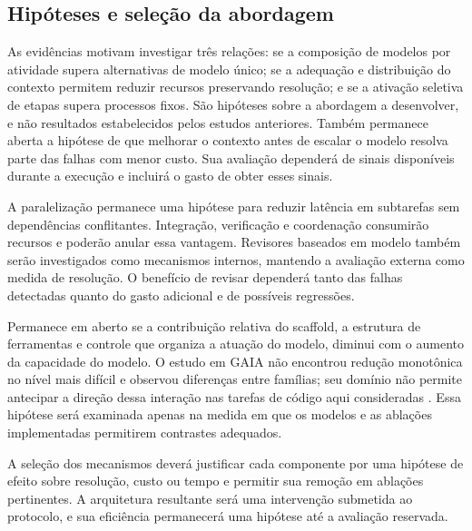 \subsection{Hipóteses e seleção da abordagem}

As evidências motivam investigar três relações: se a composição de modelos por atividade supera alternativas de modelo único; se a adequação e distribuição do contexto permitem reduzir recursos preservando resolução; e se a ativação seletiva de etapas supera processos fixos. São hipóteses sobre a abordagem a desenvolver, e não resultados estabelecidos pelos estudos anteriores. Também permanece aberta a hipótese de que melhorar o contexto antes de escalar o modelo resolva parte das falhas com menor custo. Sua avaliação dependerá de sinais disponíveis durante a execução e incluirá o gasto de obter esses sinais.

A paralelização permanece uma hipótese para reduzir latência em subtarefas sem dependências conflitantes. Integração, verificação e coordenação consumirão recursos e poderão anular essa vantagem. Revisores baseados em modelo também serão investigados como mecanismos internos, mantendo a avaliação externa como medida de resolução. O benefício de revisar dependerá tanto das falhas detectadas quanto do gasto adicional e de possíveis regressões.

Permanece em aberto se a contribuição relativa do scaffold, a estrutura de ferramentas e controle que organiza a atuação do modelo, diminui com o aumento da capacidade do modelo. O estudo em GAIA não encontrou redução monotônica no nível mais difícil e observou diferenças entre famílias; seu domínio não permite antecipar a direção dessa interação nas tarefas de código aqui consideradas \cite{Starace2026ScaffoldGAIA}. Essa hipótese será examinada apenas na medida em que os modelos e as ablações implementadas permitirem contrastes adequados.

A seleção dos mecanismos deverá justificar cada componente por uma hipótese de efeito sobre resolução, custo ou tempo e permitir sua remoção em ablações pertinentes. A arquitetura resultante será uma intervenção submetida ao protocolo, e sua eficiência permanecerá uma hipótese até a avaliação reservada.
